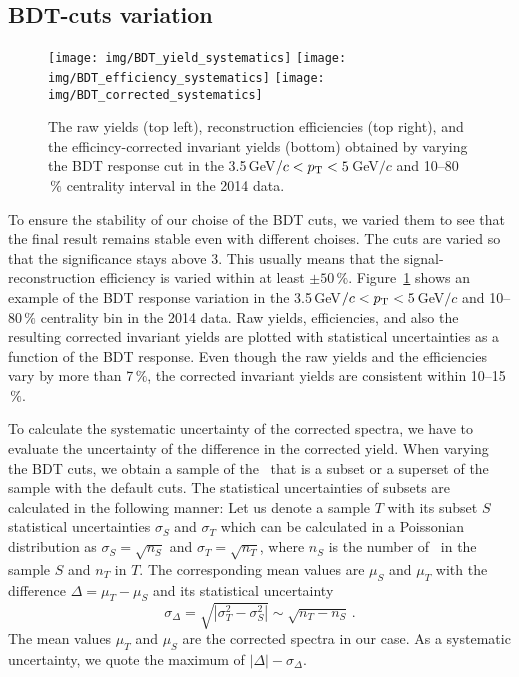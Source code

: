 \subsection{BDT-cuts variation}

\begin{figure}[!htb]
\centering
\texttt{[image: img/BDT\_yield\_systematics]}
\texttt{[image: img/BDT\_efficiency\_systematics]}
\texttt{[image: img/BDT\_corrected\_systematics]}
\caption{\label{BDT_systematics} The raw yields (top left), reconstruction efficiencies (top right), and the efficincy-corrected invariant yields (bottom) obtained by varying the BDT response cut in the 3.5$\,$GeV$/c < {p_{\mathrm{T}}} < 5\,$GeV$/c$ and 10--80$\,\%$ centrality interval in the 2014 data.}
\end{figure}

To ensure the stability of our choise of the BDT cuts, we varied them to see that the final result remains stable even with different choises. The cuts are varied so that the significance stays above 3\@. This usually means that the signal-reconstruction efficiency is varied within at least $\pm 50\,\%$\@. Figure~\ref{BDT_systematics} shows an example of the BDT response variation in the 3.5$\,$GeV$/c < {p_{\mathrm{T}}} < 5\,$GeV$/c$ and 10--80$\,\%$ centrality bin in the 2014 data. Raw yields, efficiencies, and also the resulting corrected invariant yields are plotted with statistical uncertainties as a function of the BDT response. Even though the raw yields and the efficiencies vary by more than 7$\,\%$, the corrected invariant yields are consistent within 10--15$\,\%$\@.


To calculate the systematic uncertainty of the corrected spectra, we have to evaluate the uncertainty of the difference in the corrected yield. When varying the BDT cuts, we obtain a sample of the \Lambdac\ that is a subset or a superset of the sample with the default cuts. The statistical uncertainties of subsets are calculated in the following manner: Let us denote a sample $T$ with its subset $S$ statistical uncertainties $\sigma_S$ and $\sigma_T$ which can be calculated in a Poissonian distribution as $\sigma_S = \sqrt{n_S}$ and  $\sigma_T = \sqrt{n_T}$, where $n_S$ is the number of \Lambdac\ in the sample $S$ and $n_T$ in $T$\@. The corresponding mean values are $\mu_S$ and $\mu_T$ with the difference $\Delta = \mu_T - \mu_S$ and its statistical uncertainty
\begin{equation}
 \sigma_\Delta = \sqrt{|\sigma_T^2 - \sigma_S^2|} \sim \sqrt{n_T - n_S}\,.
\end{equation}
The mean values $\mu_T$ and $\mu_S$ are the corrected spectra in our case. As a systematic uncertainty, we quote the maximum of $|\Delta| - \sigma_\Delta$\@.

